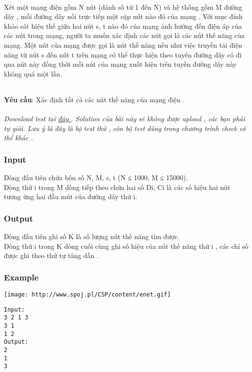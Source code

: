 

 

Xét một mạng điện gồm N nút (đánh số từ 1 đến N) và hệ thống gồm M đường dây , mỗi đường dây nối trực tiếp một cặp nút nào đó của mạng . Với mục đính khảo sát hiệu thế giữa hai nút s, t nào đó của mạng ảnh hưởng đến điện áp của các nút trong mạng, người ta muốn xác định các nút gọi là các nút thế năng của mạng. Một nút của mạng được gọi là nút thế năng nếu như việc truyền tải điện năng từ nút s đến nút t trên mạng có thể thực hiện theo tuyến đường dây có đi qua nút này đồng thời mỗi nút của mạng xuất hiện trên tuyến đường dây này không quá một lần.


\\\textbf{Yêu cầu}: Xác định tất cả các nút thế năng của mạng điện .
\\
\\\emph{Download test tại \href{http://vn.spoj.pl/content/ENET.rar}{ đây } . Solution của bài này sẽ không được upload , các bạn phải tự giải. Lưu ý là đây là bộ test thử , còn bộ test dùng trong chương trình check có thể khác . }

\subsubsection{Input}

Dòng đầu tiên chứa bốn số N, M, s, t (N ≤ 1000, M ≤ 15000).
\\Dòng thứ i trong M dòng tiếp theo chứa hai số Di, Ci là các số hiệu hai nút tương ứng hai đầu mút của đường dây thứ i.

\subsubsection{Output}

Dòng đầu tiên ghi số K là số lượng nút thế năng tìm được.
\\Dòng thứ i trong K dòng cuối cùng ghi số hiệu của nút thế năng thứ i , các chỉ số được ghi theo thứ tự tăng dần .

\subsubsection{Example}


\texttt{[image: http://www.spoj.pl/CSP/content/enet.gif]}
\begin{verbatim}
Input:
3 2 1 3
3 1
1 2
Output:
2
1
3
\end{verbatim}